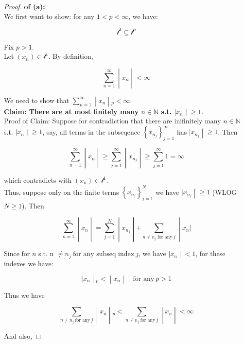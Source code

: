 \begin{proof}

\textbf{of (a):}\\
We first want to show: for any \(1 < p < \infty\), we have:

\[\mathcal{l}^{1} \subseteq \mathcal{l}^{p}\]

Fix \(p > 1\).\\
Let \((x_{n}) \in \mathcal{l}^{1}\). By definition,

\[\left. \sum\limits_{n = 1}^{\infty} \middle| x_{n} \middle| < \infty \right.\]

We need to show that \(\left. \sum_{n = 1}^{\infty} \middle| x_{n} \middle| {}_{p} < \infty \right.\).\\
\textbf{Claim: There are at most finitely many \(n \in \mathbb{N}\) s.t. \(\left. |x_{n} \middle| \geq 1 \right.\)}.\\
Proof of Claim: Suppose for contradiction that there are inifinitely many \(n \in \mathbb{N}\) s.t. \(\left. |x_{n} \middle| \geq 1 \right.\), say, all terms in the subseqence \(\left\{ x_{n_{j}} \right\}_{j = 1}^{\infty}\) has \(\left. |x_{n_{j}} \middle| \geq 1 \right.\). Then

\[\left. \sum\limits_{n = 1}^{\infty} \middle| x_{n} \middle| \geq \sum\limits_{j = 1}^{\infty} \middle| x_{n_{j}} \middle| \geq \sum\limits_{j = 1}^{\infty}1 = \infty \right.\]

which contradicts with \((x_{n}) \in \mathcal{l}^{1}\).\\
Thus, suppose only on the finite terms \(\left\{ x_{n_{j}} \right\}_{j = 1}^{N}\) we have \(\left. |x_{n_{j}} \middle| \geq 1 \right.\) (WLOG \(N \geq 1\)). Then

\[\left. \sum\limits_{n = 1}^{\infty} \middle| x_{n} \middle| = \sum\limits_{j = 1}^{N} \middle| x_{n_{j}} \middle| + \sum\limits_{n \neq n_{j}\ \text{for any}\ j} \middle| x_{n}| \right.\]

Since for \(n\) s.t. n \(\neq n_{j}\ \text{for any subseq index}\ j\), we have \(\left. |x_{n} \middle| < 1 \right.\), for these indexes we have:

\[\left. |x_{n} \middle| {}_{p} < \middle| x_{n} \middle| \quad\text{for any}\ p > 1 \right.\]

Thus we have

\[\left. \sum\limits_{n \neq n_{j}\ \text{for any}\ j} \middle| x_{n} \middle| {}_{p} < \sum\limits_{n \neq n_{j}\ \text{for any}\ j} \middle| x_{n} \middle| < \infty \right.\]

And also,


\end{proof}
